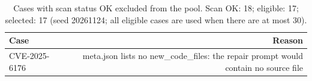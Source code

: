 \begin{table}[ht]
\centering
\caption{Cases with scan status OK excluded from the pool. Scan OK: 18; eligible: 17; selected: 17 (seed 20261124; all eligible cases are used when there are at most 30).}
\label{tab:exclusions}
\begin{tabular}{lr}
\hline
Case & Reason \\
\hline
CVE-2025-6176 & meta.json lists no new\_code\_files: the repair prompt would contain no source file \\
\hline
\end{tabular}
\end{table}
